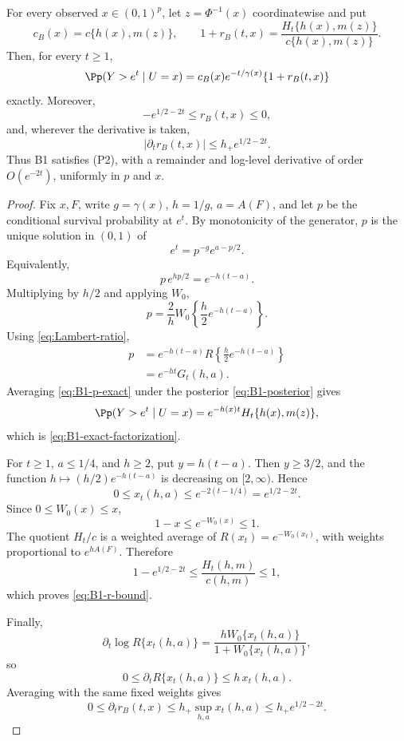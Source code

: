 \begin{lemma}
\label{lem:B1-exact-tail}
For every observed \(x\in(0,1)^p\), let
\(z=\Phi^{-1}(x)\) coordinatewise and put
\[
 c_B(x)=c\{h(x),m(z)\},
 \qquad
 1+r_B(t,x)
 =
 \frac{H_t\{h(x),m(z)\}}{c\{h(x),m(z)\}}.
\]
Then, for every \(t\ge1\),
\begin{equation}
 \Pp(Y>e^t\mid U=x)
 =
 c_B(x)e^{-t/\gamma(x)}
 \{1+r_B(t,x)\}
 \label{eq:B1-exact-factorization}
\end{equation}
exactly. Moreover,
\begin{equation}
 -e^{1/2-2t}\le r_B(t,x)\le0,
 \label{eq:B1-r-bound}
\end{equation}
and, wherever the derivative is taken,
\begin{equation}
 |\partial_t r_B(t,x)|
 \le h_+e^{1/2-2t}.
 \label{eq:B1-r-derivative}
\end{equation}
Thus B1 satisfies (P2), with a remainder and log-level derivative
of order \(O(e^{-2t})\), uniformly in \(p\) and \(x\).
\end{lemma}

\begin{proof}
Fix \(x,F\), write \(g=\gamma(x)\), \(h=1/g\),
\(a=A(F)\), and let \(p\) be the conditional survival
probability at \(e^t\). By monotonicity of the generator,
\(p\) is the unique solution in \((0,1)\) of
\[
 e^t=p^{-g}e^{a-p/2}.
\]
Equivalently,
\[
 p\,e^{hp/2}=e^{-h(t-a)}.
\]
Multiplying by \(h/2\) and applying \(W_0\),
\[
 p
 =
 \frac2hW_0\left\{\frac h2e^{-h(t-a)}\right\}.
\]
Using \eqref{eq:Lambert-ratio},
\begin{align}
 p
 &=
 e^{-h(t-a)}
 R\left\{\frac h2e^{-h(t-a)}\right\}
 \nonumber\\
 &=
 e^{-ht}G_t(h,a).
 \label{eq:B1-p-exact}
\end{align}
Averaging \eqref{eq:B1-p-exact} under the posterior
\eqref{eq:B1-posterior} gives
\[
 \Pp(Y>e^t\mid U=x)
 =
 e^{-h(x)t}H_t\{h(x),m(z)\},
\]
which is \eqref{eq:B1-exact-factorization}.

For \(t\ge1\), \(a\le1/4\), and \(h\ge2\), put
\(y=h(t-a)\). Then \(y\ge3/2\), and the function
\(h\mapsto(h/2)e^{-h(t-a)}\) is decreasing on
\([2,\infty)\). Hence
\begin{equation}
 0\le x_t(h,a)\le e^{-2(t-1/4)}
 =e^{1/2-2t}.
 \label{eq:B1-x-bound}
\end{equation}
Since \(0\le W_0(x)\le x\),
\[
 1-x\le e^{-W_0(x)}\le1.
\]
The quotient \(H_t/c\) is a weighted average of
\(R(x_t)=e^{-W_0(x_t)}\), with weights proportional to
\(e^{hA(F)}\). Therefore
\[
 1-e^{1/2-2t}
 \le \frac{H_t(h,m)}{c(h,m)}\le1,
\]
which proves \eqref{eq:B1-r-bound}.

Finally,
\[
 \partial_t\log R\{x_t(h,a)\}
 =
 \frac{hW_0\{x_t(h,a)\}}
      {1+W_0\{x_t(h,a)\}},
\]
so
\[
 0\le\partial_tR\{x_t(h,a)\}
 \le h\,x_t(h,a).
\]
Averaging with the same fixed weights gives
\[
 0\le\partial_t r_B(t,x)
 \le h_+\sup_{h,a}x_t(h,a)
 \le h_+e^{1/2-2t}.
\]
\end{proof}


